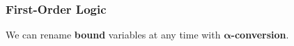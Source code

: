 \documentclass{ethz-assignment}
\begin{document}
\subsubsection{First-Order Logic}
We can rename \textbf{bound} variables at any time with $\bm{\alpha}$\textbf{-conversion}.




\end{document}
